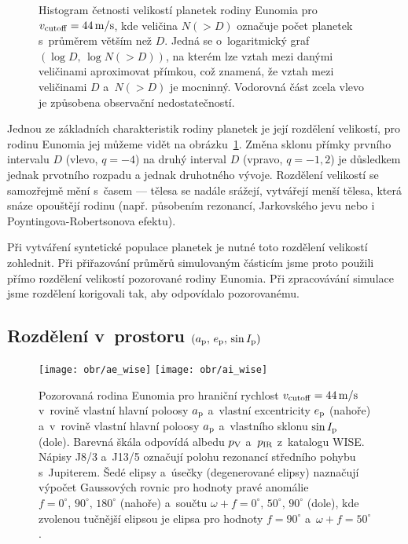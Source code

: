 \documentclass[A4paper, 12pt, oneside]{book}
\begin{document}
\begin{figure}
\begin{subfigure}[b]{0.45\textwidth}
	\end{subfigure}
	\caption{Histogram četnosti velikostí planetek rodiny Eunomia pro $v_{\rm cutoff}=44\,{\rm m/s}$, kde veličina $N({>}D)$ označuje počet planetek s~průměrem větším než $D$. Jedná se o~logaritmický graf $(\log D,\,\log N({>}D))$, na kterém lze vztah mezi danými veličinami aproximovat přímkou, což znamená, že vztah mezi veličinami $D$ a~$N({>}D)$ je mocninný. Vodorovná část zcela vlevo je způsobena observační nedostatečností.}
	\label{fig:sfd}
\end{figure}

Jednou ze základních charakteristik rodiny planetek je její rozdělení velikostí, pro rodinu Eunomia jej můžeme vidět na obrázku~\ref{fig:sfd}. Změna sklonu přímky prvního intervalu $D$ (vlevo, $q=-4$) na druhý interval $D$ (vpravo, $q=-1,2$) je důsledkem jednak prvotního rozpadu a jednak druhotného vývoje. Rozdělení velikostí se samozřejmě mění s~časem --- tělesa se nadále srážejí, vytvářejí menší tělesa, která snáze opouštějí rodinu (např. působením rezonancí, Jarkovského jevu nebo i Poyntingova-Robertsonova efektu).

Při vytváření syntetické populace planetek je nutné toto rozdělení velikostí zohlednit. Při přiřazování průměrů simulovaným částicím jsme proto použili přímo rozdělení velikostí pozorované rodiny Eunomia. Při zpracovávání simulace jsme rozdělení korigovali tak, aby odpovídalo pozorovanému.

\subsection{Rozdělení v~prostoru $(a_{\rm p},\,e_{\rm p},\,\sin I_{\rm p})$}
\begin{figure}
	\centering
	\texttt{[image: obr/ae\_wise]}
	\texttt{[image: obr/ai\_wise]}
	\caption{Pozorovaná rodina Eunomia pro hraniční rychlost $v_{\rm cutoff} = 44\,{\rm m/s}$ v~rovině vlastní hlavní poloosy $a_{\rm p}$ a~vlastní excentricity $e_{\rm p}$ (nahoře) a~v~rovině vlastní hlavní poloosy $a_{\rm p}$ a~vlastního sklonu $\sin I_{\rm p}$ (dole). Barevná škála odpovídá albedu $p_{\rm V}$ a~$p_{\rm IR}$ z~katalogu WISE\@. Nápisy J8/3 a~J13/5 označují polohu rezonancí středního pohybu s~Jupiterem. Šedé elipsy a~úsečky (degenerované elipsy) naznačují výpočet Gaussových rovnic pro hodnoty pravé anomálie $f=0^\circ,\,90^\circ,\,180^\circ$ (nahoře) a~součtu $\omega+f=0^\circ,\, 50^\circ,\, 90^\circ$ (dole), kde zvolenou tučnější elipsou je elipsa pro hodnoty $f=90^\circ$ a~$\omega+f=50^\circ$.}
	\label{fig:ae_ai_wise}
\end{figure}
\end{document}
